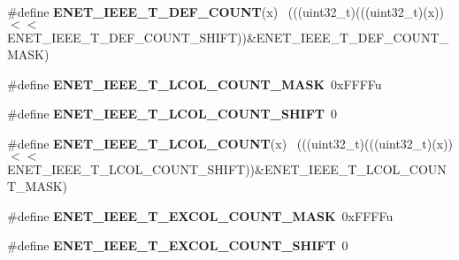 \begin{DoxyCompactItemize}
\item 
\hypertarget{group___e_n_e_t___register___masks_ga95aa568cb2d791f45ecf3141cf7c6bb5}{}\#define {\bfseries E\+N\+E\+T\+\_\+\+I\+E\+E\+E\+\_\+\+T\+\_\+\+D\+E\+F\+\_\+\+C\+O\+U\+N\+T}(x)                              ~(((uint32\+\_\+t)(((uint32\+\_\+t)(x))$<$$<$E\+N\+E\+T\+\_\+\+I\+E\+E\+E\+\_\+\+T\+\_\+\+D\+E\+F\+\_\+\+C\+O\+U\+N\+T\+\_\+\+S\+H\+I\+F\+T))\&E\+N\+E\+T\+\_\+\+I\+E\+E\+E\+\_\+\+T\+\_\+\+D\+E\+F\+\_\+\+C\+O\+U\+N\+T\+\_\+\+M\+A\+S\+K)\label{group___e_n_e_t___register___masks_ga95aa568cb2d791f45ecf3141cf7c6bb5}

\item 
\hypertarget{group___e_n_e_t___register___masks_ga041ada9082f15cabd8d535dba84fbfba}{}\#define {\bfseries E\+N\+E\+T\+\_\+\+I\+E\+E\+E\+\_\+\+T\+\_\+\+L\+C\+O\+L\+\_\+\+C\+O\+U\+N\+T\+\_\+\+M\+A\+S\+K}~0x\+F\+F\+F\+Fu\label{group___e_n_e_t___register___masks_ga041ada9082f15cabd8d535dba84fbfba}

\item 
\hypertarget{group___e_n_e_t___register___masks_ga2c352d386efb6087a1449f6ff8e49e28}{}\#define {\bfseries E\+N\+E\+T\+\_\+\+I\+E\+E\+E\+\_\+\+T\+\_\+\+L\+C\+O\+L\+\_\+\+C\+O\+U\+N\+T\+\_\+\+S\+H\+I\+F\+T}~0\label{group___e_n_e_t___register___masks_ga2c352d386efb6087a1449f6ff8e49e28}

\item 
\hypertarget{group___e_n_e_t___register___masks_ga8cc6c0272449186a48533d02b03402cd}{}\#define {\bfseries E\+N\+E\+T\+\_\+\+I\+E\+E\+E\+\_\+\+T\+\_\+\+L\+C\+O\+L\+\_\+\+C\+O\+U\+N\+T}(x)                            ~(((uint32\+\_\+t)(((uint32\+\_\+t)(x))$<$$<$E\+N\+E\+T\+\_\+\+I\+E\+E\+E\+\_\+\+T\+\_\+\+L\+C\+O\+L\+\_\+\+C\+O\+U\+N\+T\+\_\+\+S\+H\+I\+F\+T))\&E\+N\+E\+T\+\_\+\+I\+E\+E\+E\+\_\+\+T\+\_\+\+L\+C\+O\+L\+\_\+\+C\+O\+U\+N\+T\+\_\+\+M\+A\+S\+K)\label{group___e_n_e_t___register___masks_ga8cc6c0272449186a48533d02b03402cd}

\item 
\hypertarget{group___e_n_e_t___register___masks_ga4b5fe7076adb4e19e1271ca3f6f27d16}{}\#define {\bfseries E\+N\+E\+T\+\_\+\+I\+E\+E\+E\+\_\+\+T\+\_\+\+E\+X\+C\+O\+L\+\_\+\+C\+O\+U\+N\+T\+\_\+\+M\+A\+S\+K}~0x\+F\+F\+F\+Fu\label{group___e_n_e_t___register___masks_ga4b5fe7076adb4e19e1271ca3f6f27d16}

\item 
\hypertarget{group___e_n_e_t___register___masks_gab0ed20dee5a8a4ad851053c9bb9359e8}{}\#define {\bfseries E\+N\+E\+T\+\_\+\+I\+E\+E\+E\+\_\+\+T\+\_\+\+E\+X\+C\+O\+L\+\_\+\+C\+O\+U\+N\+T\+\_\+\+S\+H\+I\+F\+T}~0\label{group___e_n_e_t___register___masks_gab0ed20dee5a8a4ad851053c9bb9359e8}


\end{DoxyCompactItemize}

